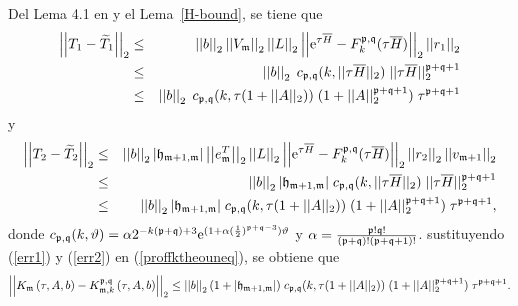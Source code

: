 Del Lema 4.1 en \cite{jimenez2012convergence} y el Lema~\ref{H-bound}, se tiene que
\begin{eqnarray}
\left\lvert\left\lvert T_1 - \widetilde{T}_1\right\rvert\right\rvert_2
&\leq& \left\lvert \left\lvert b \right\rvert \right\rvert_2 \left\lvert\left\lvert  V_{\mathfrak{m}} \right\rvert\right\rvert_2 \left\lvert\left\lvert  L \right\rvert\right\rvert_2 \left\lvert\left\lvert \mathrm{e}^{\tau  \overline{H}}-F_k^{\mathfrak{p},\mathfrak{q}}(\tau \overline{H}) \right\rvert\right\rvert_2
\left\lvert\left\lvert  r_1 \right\rvert\right\rvert_2 \nonumber\\
&\leq& \left\lvert \left\lvert b \right\rvert \right\rvert_2 \;  c_{\mathfrak{p},\mathfrak{q}}(k,\lvert\lvert\tau\overline{H}\rvert\rvert_2) \;
\lvert\lvert\tau \overline{H}\rvert\rvert_2^{\mathfrak{p}+\mathfrak{q}+1}\nonumber\\
&\leq& \left\lvert \left\lvert b \right\rvert \right\rvert_2 \; c_{\mathfrak{p},\mathfrak{q}}(k,\tau (1+\lvert\lvert A \rvert\rvert_2))
\; (1 + \lvert\lvert A \rvert\rvert_2^{\mathfrak{p}+\mathfrak{q}+1}) \; \tau^{\mathfrak{p}+\mathfrak{q}+1}
\label{err1}
\end{eqnarray}
y
\begin{eqnarray}
\left\lvert\left\lvert T_2 - \widetilde{T}_2 \right\rvert\right\rvert_2
&\leq& \left\lvert \left\lvert b \right\rvert \right\rvert_2 \lvert \mathfrak{h}_{\mathfrak{m}+1,\mathfrak{m}}\rvert \left\lvert\left\lvert  e_{\mathfrak{m}}^T \right\rvert\right\rvert_2 \left\lvert\left\lvert  L \right\rvert\right\rvert_2 \left\lvert\left\lvert \mathrm{e}^{\tau \overline{H}}-
F_k^{\mathfrak{p},\mathfrak{q}}(\tau \overline{H}) \right\rvert\right\rvert_2  \left\lvert\left\lvert  r_2 \right\rvert\right\rvert_2 \left\lvert\left\lvert v_{\mathfrak{m}+1}\right\rvert\right\rvert_2 \nonumber\\
&\leq&\left\lvert \left\lvert b \right\rvert \right\rvert_2 \lvert \mathfrak{h}_{\mathfrak{m}+1,\mathfrak{m}}\rvert \; c_{\mathfrak{p},\mathfrak{q}}
(k,\lvert\lvert\tau \overline{H}\rvert\rvert_2) \;
\lvert\lvert\tau \overline{H}\rvert\rvert_2^{\mathfrak{p}+\mathfrak{q}+1}\nonumber\\
&\leq& \left\lvert \left\lvert b \right\rvert \right\rvert_2 \lvert \mathfrak{h}_{\mathfrak{m}+1,\mathfrak{m}}\rvert \; c_{\mathfrak{p},\mathfrak{q}}(k,\tau (1+\lvert\lvert A \rvert\rvert_2))
\; (1 + \lvert\lvert A \rvert\rvert_2^{\mathfrak{p}+\mathfrak{q}+1}) \; \tau^{\mathfrak{p}+\mathfrak{q}+1}\label{err2},
\end{eqnarray}
donde $c_{\mathfrak{p},\mathfrak{q}}(k,\vartheta )=\alpha
2^{-k(\mathfrak{p}+\mathfrak{q})+3}\mathrm{e}^{(1+\alpha(\frac{1}{2})^{\mathfrak{p}+\mathfrak{q}-3})\vartheta }$ y $%
\alpha =\frac{\pf!\qf!}{(\pf+\qf)!(\pf+\qf+1)!}$. sustituyendo (\ref{err1}) y (\ref{err2}) en (\ref{proffktheouneq}), se obtiene que
\begin{equation}
\left\lvert\left\lvert   K_{\mathfrak{m}}\left( \tau , A , b \right) -
K_{\mathfrak{m},k}^{\mathfrak{p},\mathfrak{q}}\left( \tau, A , b \right) \right\rvert\right\rvert_2
\leq \left\lvert \left\lvert b \right\rvert \right\rvert_2 (1+\lvert\mathfrak{h}_{\mathfrak{m}+1,\mathfrak{m}}\rvert) \; c_{\mathfrak{p},\mathfrak{q}}(k,\tau (1+\lvert\lvert A \rvert\rvert_2))
\; (1 + \lvert\lvert A \rvert\rvert_2^{\mathfrak{p}+\mathfrak{q}+1}) \; \tau^{\mathfrak{p}+\mathfrak{q}+1}. \label{errp1}
\end{equation}

